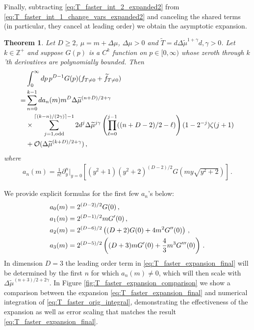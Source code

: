 \documentclass[sn-mathphys,Numbered]{sn-jnl}
\newtheorem{theorem}{Theorem}
\begin{document}

Finally, subtracting \eqref{eq:T_faster_int_2_expanded2} from \eqref{eq:T_faster_int_1_change_vars_expanded2} and canceling the shared terms (in particular, they cancel at leading order) we  obtain the asymptotic expansion.
\begin{theorem}\label{thms:T_decay_faster}
Let $D\geq 2$,     $\mu=m+\Delta\mu$, $\Delta\mu>0$ and $\widetilde{T}=d\Delta\widetilde{\mu}^{1+\gamma}$$d,\gamma>0$.  Let $k\in\mathbb{Z}^+$ and suppose $G(p)$ is a $C^k$ function on $p\in[0,\infty)$ whose zeroth through $k$'th derivatives are polynomially bounded. Then
\begin{align}
    &\int_0^\infty dp\, p^{D-1} G(p)(f_{T\neq 0}+\widetilde{f}_{T\neq 0})\label{eq:T_faster_orig_integral}\\
    =& \sum_{n=0}^{k-1} da_n(m)m^{D}\Delta\widetilde{\mu}^{(n+D)/2+\gamma}\label{eq:T_faster_expansion_final}\\
    &\times\sum_{j=1,\mathrm{odd}}^{\lceil(k-n)/(2\gamma)\rceil-1}
 2d^j\Delta\widetilde{\mu}^{j\gamma}\left(\prod_{\ell=0}^{j-1}((n+D-2)/2-\ell) \right)(1-2^{-j})\zeta(j+1) \notag\\
    &+\mathcal{O}(\Delta\widetilde{\mu}^{(k+D)/2+\gamma})\,,\notag
\end{align} 
where
\begin{align}\label{eq:an_def}
a_n(m)=\frac{1}{n!}\partial_y^n|_{y=0}\left[  (y^2+1)(  y^2+2)^{(D-2)/2} G\left(my\sqrt{y^2+2}\right)\right]\,.
\end{align}
\end{theorem}
We provide explicit formulas for the first few  $a_n$'s below:
\begin{align}\label{eq:first_few_a_ns}
  &a_0(m)=2^{(D-2)/2} G(0)\,,\\
  &a_1(m)=2^{(D-1)/2}mG^\prime(0)\,,\notag\\
  &a_2(m)=2^{(D-6)/2}\left((D+2)G(0)+4m^2 G^{\prime\prime}(0)\right)\,,\notag\\
  &a_3(m)=2^{(D - 5)/2} \left((D + 3) m G^\prime(0) +  \frac{4}{3}m^3 G^{\prime\prime\prime}(0) \right)\,.\notag
\end{align}
In dimension $D=3$ the leading order term in \eqref{eq:T_faster_expansion_final} will be determined by the first $n$ for which $a_n(m)\neq 0$, which will then scale with $\Delta\widetilde{\mu}^{(n+3)/2+2\gamma}$.  In Figure \ref{fig:T_faster_expansion_comparison} we show a comparison between the expansion \eqref{eq:T_faster_expansion_final} and numerical integration of \eqref{eq:T_faster_orig_integral}, demonstrating the effectiveness of the expansion as well as error scaling that matches the result \eqref{eq:T_faster_expansion_final}.
\end{document}
